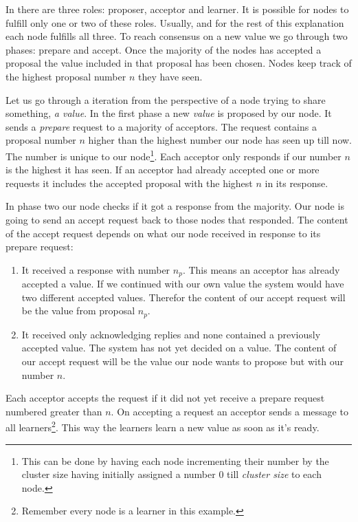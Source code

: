 In \paxos{} there are three roles: proposer, acceptor and learner. It is possible for nodes to fulfill only one or two of these roles. Usually, and for the rest of this explanation each node fulfills all three. To reach consensus on a new value we go through two phases: prepare and accept. Once the majority of the nodes has accepted a proposal the value included in that proposal has been chosen. Nodes keep track of the highest proposal number $n$ they have seen. 

Let us go through a \paxos{} iteration from the perspective of a node trying to share something, \textit{a value}. In the first phase a new \textit{value} is proposed by our node. It sends a \textit{prepare} request to a majority of acceptors. The request contains a proposal number $n$ higher than the highest number our node has seen up till now. The number is unique to our node\footnote{This can be done by having each node incrementing their number by the cluster size having initially assigned a number $0$ till \textit{cluster size} to each node.}. Each acceptor only responds if our number $n$ is the highest it has seen. If an acceptor had already accepted one or more requests it includes the accepted proposal with the highest $n$ in its response.

In phase two our node checks if it got a response from the majority. Our node is going to send an accept request back to those nodes that responded. The content of the accept request depends on what our node received in response to its prepare request:
%
\begin{enumerate}
	\item It received a response with number $n_p$. This means an acceptor has already accepted a value. If we continued with our own value the system would have two different accepted values. Therefor the content of our accept request will be the value from proposal $n_p$.
	\item It received only acknowledging replies and none contained a previously accepted value. The system has not yet decided on a value. The content of our accept request will be the value our node wants to propose but with our number $n$.
\end{enumerate}
%
Each acceptor accepts the request if it did not yet receive a prepare request numbered greater than $n$. On accepting a request an acceptor sends a message to all learners\footnote{Remember every node is a learner in this example.}. This way the learners learn a new value as soon as it's ready.

